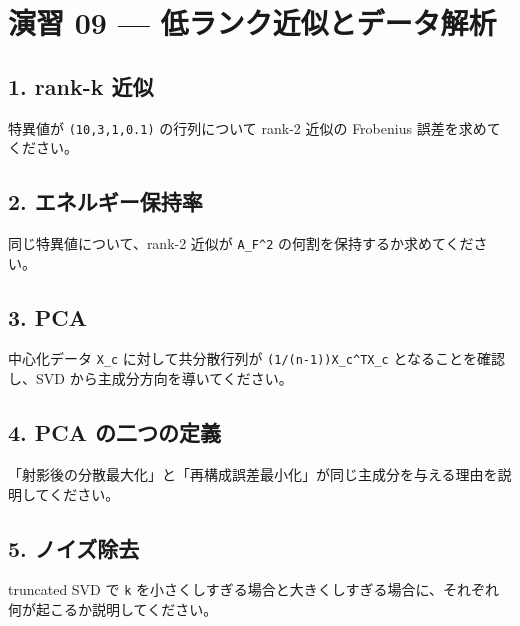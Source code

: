 \documentclass[
  11pt,
  a4paper,
]{ltjsarticle}
\author{}
\date{}
\begin{document}
\hypertarget{ux6f14ux7fd2-09-ux4f4eux30e9ux30f3ux30afux8fd1ux4f3cux3068ux30c7ux30fcux30bfux89e3ux6790}{%
\section{演習 09 ---
低ランク近似とデータ解析}\label{ux6f14ux7fd2-09-ux4f4eux30e9ux30f3ux30afux8fd1ux4f3cux3068ux30c7ux30fcux30bfux89e3ux6790}}

\hypertarget{rank-k-ux8fd1ux4f3c}{%
\subsection{1. rank-k 近似}\label{rank-k-ux8fd1ux4f3c}}

特異値が \texttt{(10,3,1,0.1)} の行列について rank-2 近似の Frobenius
誤差を求めてください。

\hypertarget{ux30a8ux30cdux30ebux30aeux30fcux4fddux6301ux7387}{%
\subsection{2.
エネルギー保持率}\label{ux30a8ux30cdux30ebux30aeux30fcux4fddux6301ux7387}}

同じ特異値について、rank-2 近似が
\texttt{\textbar{}\textbar{}A\textbar{}\textbar{}\_F\^{}2}
の何割を保持するか求めてください。

\hypertarget{pca}{%
\subsection{3. PCA}\label{pca}}

中心化データ \texttt{X\_c} に対して共分散行列が
\texttt{(1/(n-1))X\_c\^{}TX\_c} となることを確認し、SVD
から主成分方向を導いてください。

\hypertarget{pca-ux306eux4e8cux3064ux306eux5b9aux7fa9}{%
\subsection{4. PCA
の二つの定義}\label{pca-ux306eux4e8cux3064ux306eux5b9aux7fa9}}

「射影後の分散最大化」と「再構成誤差最小化」が同じ主成分を与える理由を説明してください。

\hypertarget{ux30ceux30a4ux30baux9664ux53bb}{%
\subsection{5. ノイズ除去}\label{ux30ceux30a4ux30baux9664ux53bb}}

truncated SVD で \texttt{k}
を小さくしすぎる場合と大きくしすぎる場合に、それぞれ何が起こるか説明してください。
\end{document}
